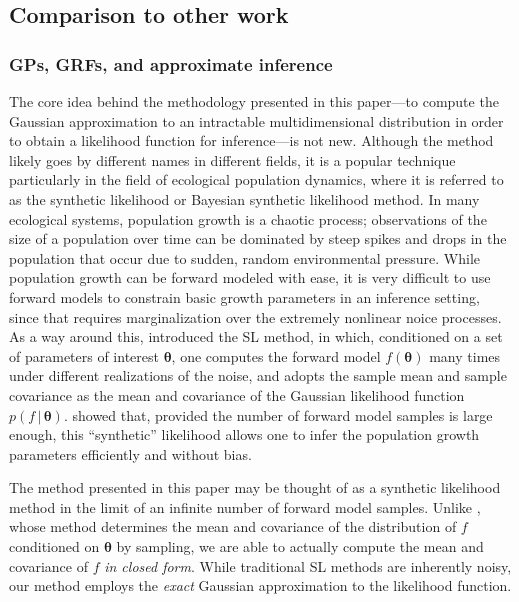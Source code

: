 \documentclass[modern]{aastex62}
\begin{document}
\pagebreak

\subsection{Comparison to other work}
\label{sec:other-work}

\subsubsection{GPs, GRFs, and approximate inference}

The core idea behind the methodology presented in this paper---to compute the
Gaussian approximation to an intractable multidimensional distribution in order
to obtain a likelihood function for inference---is not new. Although the
method likely goes by different names in different fields, it is a popular
technique particularly in the field of ecological population dynamics,
where it is referred to as the synthetic likelihood \citep[SL;][]{Wood2010}
or Bayesian synthetic likelihood \citep[BSL;][]{Price2018} method. In many
ecological systems, population growth is a chaotic process; observations of the
size of a population over time can be dominated by steep spikes and drops
in the population that occur due to sudden, random environmental pressure.
While population growth can be forward modeled with ease, it is very
difficult to use forward models to constrain basic growth parameters in an
inference setting, since that requires marginalization over the extremely
nonlinear noice processes. As a way around this, \citet{Wood2010} introduced
the SL method, in which, conditioned on a set of parameters of interest
$\pmb{\theta}$, one computes the forward model $f(\pmb{\theta})$ many times
under different realizations of the noise, and adopts the sample mean
and sample covariance as the mean and covariance of the Gaussian likelihood
function $p(f \, | \, \pmb{\theta})$. \citet{Wood2010} showed that,
provided the number of forward model samples is large enough, this
``synthetic'' likelihood allows one to infer the population growth parameters
efficiently and without bias.

The method presented in this paper may be thought of as a synthetic likelihood
method in the limit of an infinite number of forward model samples. Unlike
\citet{Wood2010}, whose method determines the mean and covariance of the
distribution of $f$ conditioned on $\pmb{\theta}$ by sampling, we are able
to actually compute the mean and covariance of $f$ \emph{in closed form}.
While traditional SL methods are inherently noisy, our method employs
the \emph{exact} Gaussian approximation to the likelihood function.
\end{document}

